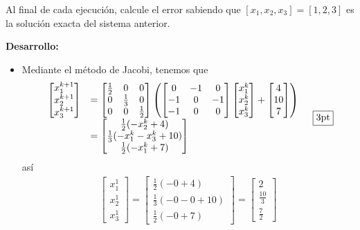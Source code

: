 \documentclass[11pt]{article}
\begin{document}
\begin{enumerate}
Al final de cada ejecuci\'on, calcule el error sabiendo que $[x_1,x_2,x_3] = [1,2,3]$ es la soluci\'on exacta del sistema anterior.

 \textbf{Desarrollo:}
 \begin{itemize}
 \item Mediante el m\'etodo de Jacobi, tenemos que
 $$
 \begin{array}{cl}
\begin{bmatrix}
x_1^{k+1}\\x_2^{k+1}\\x_3^{k+1}
\end{bmatrix}
&=
 \begin{bmatrix}
 \frac{1}{2} & 0 & 0 \\
 0 & \frac{1}{3} & 0 \\
 0 & 0 & \frac{1}{2}
 \end{bmatrix}
\left( 
 \begin{bmatrix}
 0 & -1 & 0 \\
 -1 & 0 & -1 \\
 -1 & 0 & 0
 \end{bmatrix}
 \begin{bmatrix}
 x_{1}^k\\x_{2}^k\\x_{3}^k
 \end{bmatrix}
 +
 \begin{bmatrix}
 4 \\ 10 \\ 7
 \end{bmatrix}
\right)\\
&=
\begin{bmatrix}
\frac{1}{2}(-x_2^k +4)\\
\frac{1}{3}(-x_1^k-x_3^k+10)\\
\frac{1}{2}(-x_1^k+7)
\end{bmatrix}
\end{array} \quad\fbox{3pt}
 $$
 as\'i
$$
\begin{array}{l}
\begin{bmatrix}
x_1^{1}\\x_2^{1}\\x_3^{1}
\end{bmatrix}
=
\begin{bmatrix}
\frac{1}{2}(-0 +4)\\
\frac{1}{3}(-0-0+10)\\
\frac{1}{2}(-0+7)
\end{bmatrix}
=
\begin{bmatrix}
2\\ \frac{10}{3} \\ \frac{7}{2}

\end{bmatrix}
\end{array}$$
\end{itemize}
\end{enumerate}
\end{document}
